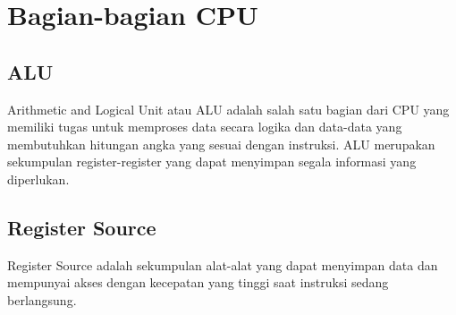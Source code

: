 \section{Bagian-bagian CPU}
	\subsection{ALU}
	Arithmetic and Logical Unit atau ALU adalah salah satu bagian dari CPU yang memiliki tugas untuk memproses data secara logika dan data-data yang membutuhkan hitungan angka yang sesuai dengan instruksi. ALU merupakan sekumpulan register-register yang dapat menyimpan segala informasi yang diperlukan.
	\subsection{Register Source}
	Register Source adalah sekumpulan alat-alat yang dapat menyimpan data dan mempunyai akses dengan kecepatan yang tinggi saat instruksi sedang berlangsung.
